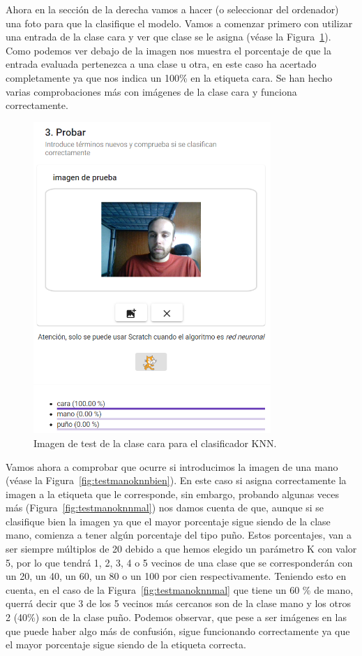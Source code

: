 \documentclass[a4paper, 12pt]{book}
\begin{document}
Ahora en la sección de la derecha vamos a hacer (o seleccionar del ordenador) una foto para que la clasifique el modelo. Vamos a comenzar primero con utilizar una entrada de la clase cara y ver que clase se le asigna (véase la Figura~\ref{fig:testcaraknn}). Como podemos ver debajo de la imagen nos muestra el porcentaje de que la entrada evaluada pertenezca a una clase u otra, en este caso ha acertado completamente ya que nos indica un 100\% en la etiqueta cara. Se han hecho varias comprobaciones más con imágenes de la clase cara y funciona correctamente.

\begin{figure}
	\centering
	\includegraphics[width=9cm, keepaspectratio]{img/testcaraknn}
	\caption{Imagen de test de la clase cara para el clasificador KNN.}			
	\label{fig:testcaraknn}
\end{figure}

Vamos ahora a comprobar que ocurre si introducimos la imagen de una mano (véase la Figura~\ref{fig:testmanoknnbien}). En este caso si asigna correctamente la imagen a la etiqueta que le corresponde, sin embargo, probando algunas veces más (Figura~\ref{fig:testmanoknnmal}) nos damos cuenta de que, aunque si se clasifique bien la imagen ya que el mayor porcentaje sigue siendo de la clase mano, comienza a tener algún porcentaje del tipo puño. Estos porcentajes, van a ser siempre múltiplos de 20 debido a que hemos elegido un parámetro K con valor 5, por lo que tendrá 1, 2, 3, 4 o 5 vecinos de una clase que se corresponderán con un 20, un 40, un 60, un 80 o un 100 por cien respectivamente. Teniendo esto en cuenta, en el caso de la Figura~\ref{fig:testmanoknnmal} que tiene un 60 \% de mano, querrá decir que 3 de los 5 vecinos más cercanos son de la clase mano y los otros 2 (40\%) son de la clase puño. Podemos observar, que pese a ser imágenes en las que puede haber algo más de confusión, sigue funcionando correctamente ya que el mayor porcentaje sigue siendo de la etiqueta correcta.
\end{document}
